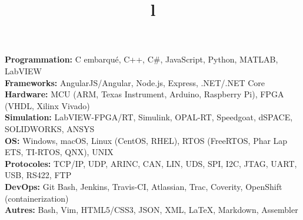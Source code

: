 \documentclass[mm]{res}
\begin{document}



\begin{resume}

\npspctoprule
\section{\headingskills}
\tb \textbf{Programmation:} C embarqu\'e, C++, C\#, JavaScript, Python, MATLAB, LabVIEW\\
\tb \textbf{Frameworks:} AngularJS/Angular, Node.js, Express, .NET/.NET Core\\
\tb \textbf{Hardware:} MCU (ARM, Texas Instrument, Arduino, Raspberry Pi), FPGA (VHDL, Xilinx Vivado)\\
\tb \textbf{Simulation:} LabVIEW-FPGA/RT, Simulink, OPAL-RT, Speedgoat, dSPACE, SOLIDWORKS, ANSYS\\
\tb \textbf{OS:} Windows, macOS, Linux (CentOS, RHEL), RTOS (FreeRTOS, Phar Lap ETS, TI-RTOS, QNX), UNIX\\
\tb \textbf{Protocoles:} TCP/IP, UDP, ARINC, CAN, LIN, UDS, SPI, I2C, JTAG, UART, USB, RS422, FTP\\
\tb \textbf{DevOps:} Git Bash, Jenkins, Travis-CI, Atlassian, Trac, Coverity, OpenShift (containerization)\\
\tb \textbf{Autres:} Bash, Vim, HTML5/CSS3, JSON, XML, \LaTeX, Markdown, Assembler

\toprule

\section{\headingeducation}
\begin{format}
\\
\title{l}\\
\end{format}  


\end{resume}
\end{document}
